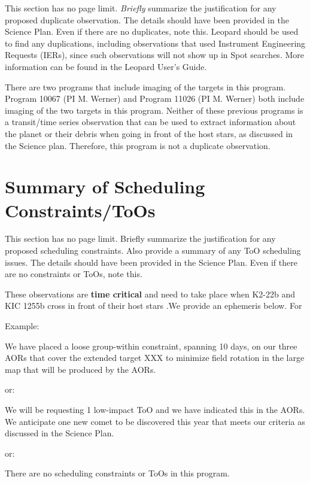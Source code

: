 \documentclass[letterpaper,12pt]{article}
\begin{document}
This section has no page limit. {\it Briefly} summarize the justification for 
any proposed duplicate observation. The details should have been provided in the
Science Plan.  Even if there are no duplicates, note this. Leopard should be 
used to find any duplications, including observations that used Instrument
Engineering Requests (IERs), since such observations will not
show up in Spot searches. More information can be found in the
Leopard User's Guide.\newline

There are two programs that include imaging of the targets in this program.
Program 10067 (PI M. Werner) and Program 11026 (PI M. Werner) both include imaging of the two targets in this program.
Neither of these previous programs is a transit/time series observation that can be used to extract information about the planet or their debris when going in front of the host stars, as discussed in the Science plan.
Therefore, this program is not a duplicate observation.

%
%
%


\section{Summary of Scheduling Constraints/ToOs}

This section has no page limit. Briefly summarize the justification for 
any proposed scheduling constraints. 
Also provide a summary of any ToO scheduling issues. 
The details should have been provided in the Science Plan. Even if there 
are no constraints or ToOs, note this.\newline

These observations are \textbf{time critical} and need to take place when K2-22b and KIC 1255b cross in front of their host stars .We provide an ephemeris below. For

\noindent Example:

We have placed a loose group-within constraint, spanning 10 days,
on our three AORs that cover the extended target XXX to 
minimize field rotation in the large map that will be produced by the AORs.\newline

\noindent or:\noindent 

We will be requesting 1 low-impact ToO and we have indicated this in the 
AORs.  We anticipate one new comet to be discovered this year that meets 
our criteria as discussed in the Science Plan.\newline

\noindent or:

There are no scheduling constraints or ToOs in this program.
\end{document}
